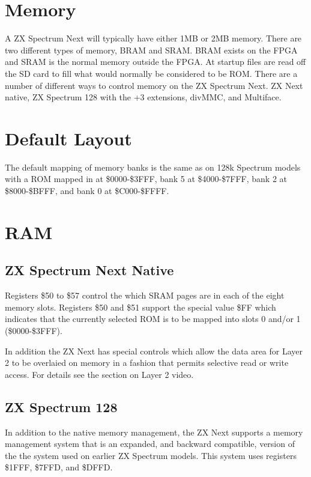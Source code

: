 \section {Memory}
A ZX Spectrum Next will typically have either 1MB or 2MB memory. There
are two different types of memory, BRAM and SRAM. BRAM exists on the
FPGA and SRAM is the normal memory outside the FPGA. At startup files
are read off the SD card to fill what would normally be considered to
be ROM. There are a number of different ways to control memory on the
ZX Spectrum Next.  ZX Next native, ZX Spectrum 128 with the +3
extensions, divMMC, and Multiface.

\section{Default Layout}
The default mapping of memory banks is the same as on 128k Spectrum
models with a ROM mapped in at \$0000-\$3FFF, bank 5 at \$4000-\$7FFF,
bank 2 at \$8000-\$BFFF, and bank 0 at \$C000-\$FFFF.

\section{RAM}

\subsection{ZX Spectrum Next Native}
Registers \$50 to \$57 control the which SRAM pages are in each of the
eight memory slots.  Registers \$50 and \$51 support the special value
\$FF which indicates that the currently selected ROM is to be mapped
into slots 0 and/or 1 (\$0000-\$3FFF).










In addition the ZX Next has special controls which allow the data area
for Layer 2 to be overlaied on memory in a fashion that permits
selective read or write access. For details see the section on Layer 2
video.

\subsection{ZX Spectrum 128}
In addition to the native memory management, the ZX Next supports a
memory management system that is an expanded, and backward compatible,
version of the the system used on earlier ZX Spectrum models. This
system uses registers \$1FFF, \$7FFD, and \$DFFD.

